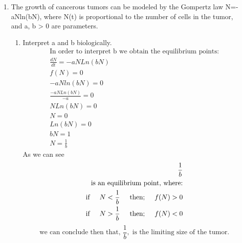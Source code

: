\documentclass[a4paper,10pt]{article}
\begin{document}
\begin{enumerate}
    \item 
    The growth of cancerous tumors can be modeled by the Gompertz law N=-aNln(bN), where N(t) is proportional to the number of cells in the tumor, and a, b > 0 are parameters.
    \begin{enumerate}
        \item Interpret a and b biologically.
                \begin{equation}
                    \begin{aligned}
                        \text{In order to interpret  b we obtain the equilibrium points:}\\
                        \frac{dN}{dt}=-aNLn(bN)\\
                        f(N)=0\\
                        -aNln(bN)=0\\
                        \frac{-aNLn(bN)}{-a}=0\\
                        NLn(bN)=0\\
                        N=0\\
                        Ln(bN)=0\\
                        bN=1\\
                        N=\frac{1}{b}
                    \end{aligned}
                \end{equation}
                As we can see
                \begin{equation}
                    \begin{aligned}
                        \frac{1}{b}\\
                        \text{is an equilibrium point, where:}\\
                        \text{if}\hspace{0.5cm} N < \frac{1}{b}\hspace{0.5cm} \text{then;}\hspace{0.5cm} f(N)> 0\\
                        \text{if}\hspace{0.5cm} N > \frac{1}{b}\hspace{0.5cm} \text{then;}\hspace{0.5cm} f(N)< 0
                    \end{aligned}
                \end{equation}
                \begin{equation}
                \text{we can conclude then that, }\frac{1}{b},\text{ is the limiting size of the tumor.}

\end{equation}
\end{enumerate}
\end{enumerate}
\end{document}

